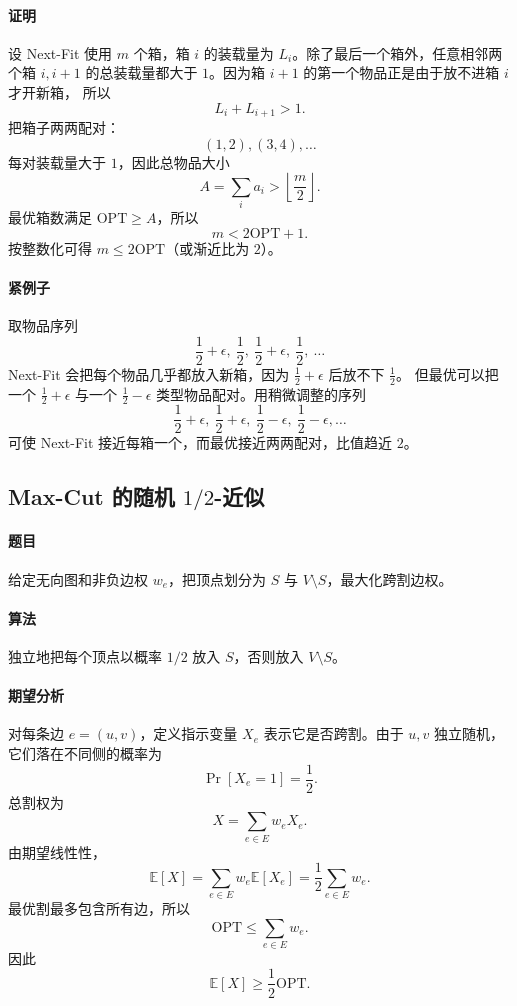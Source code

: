 \documentclass[UTF8,openany,12pt]{ctexbook}
\theoremstyle{remark}
\newcommand{\OPT}{\mathrm{OPT}}
\begin{document}
\paragraph{证明}
设 Next-Fit 使用 $m$ 个箱，箱 $i$ 的装载量为 $L_i$。除了最后一个箱外，任意相邻两个箱
$i,i+1$ 的总装载量都大于 $1$。因为箱 $i+1$ 的第一个物品正是由于放不进箱 $i$ 才开新箱，
所以
\[
  L_i+L_{i+1}>1.
\]
把箱子两两配对：
\[
  (1,2),(3,4),\dots
\]
每对装载量大于 $1$，因此总物品大小
\[
  A=\sum_i a_i > \left\lfloor\frac m2\right\rfloor.
\]
最优箱数满足 $\OPT\ge A$，所以
\[
  m<2\OPT+1.
\]
按整数化可得 $m\le 2\OPT$（或渐近比为 $2$）。

\paragraph{紧例子}
取物品序列
\[
  \frac12+\epsilon,\ \frac12,\ \frac12+\epsilon,\ \frac12,\ \dots
\]
Next-Fit 会把每个物品几乎都放入新箱，因为 $\frac12+\epsilon$ 后放不下 $\frac12$。
但最优可以把一个 $\frac12+\epsilon$ 与一个 $\frac12-\epsilon$ 类型物品配对。用稍微调整的序列
\[
  \frac12+\epsilon,\ \frac12+\epsilon,\ \frac12-\epsilon,\ \frac12-\epsilon,\dots
\]
可使 Next-Fit 接近每箱一个，而最优接近两两配对，比值趋近 $2$。

\subsection[Max-Cut 的随机 1/2-近似]{Max-Cut 的随机 $1/2$-近似}

\paragraph{题目}
给定无向图和非负边权 $w_e$，把顶点划分为 $S$ 与 $V\setminus S$，最大化跨割边权。

\paragraph{算法}
独立地把每个顶点以概率 $1/2$ 放入 $S$，否则放入 $V\setminus S$。

\paragraph{期望分析}
对每条边 $e=(u,v)$，定义指示变量 $X_e$ 表示它是否跨割。由于 $u,v$ 独立随机，
它们落在不同侧的概率为
\[
  \Pr[X_e=1]=\frac12.
\]
总割权为
\[
  X=\sum_{e\in E}w_eX_e.
\]
由期望线性性，
\[
  \mathbb E[X]=\sum_{e\in E}w_e\mathbb E[X_e]
  =\frac12\sum_{e\in E}w_e.
\]
最优割最多包含所有边，所以
\[
  \OPT\le \sum_{e\in E}w_e.
\]
因此
\[
  \mathbb E[X]\ge \frac12\OPT.
\]
\end{document}
